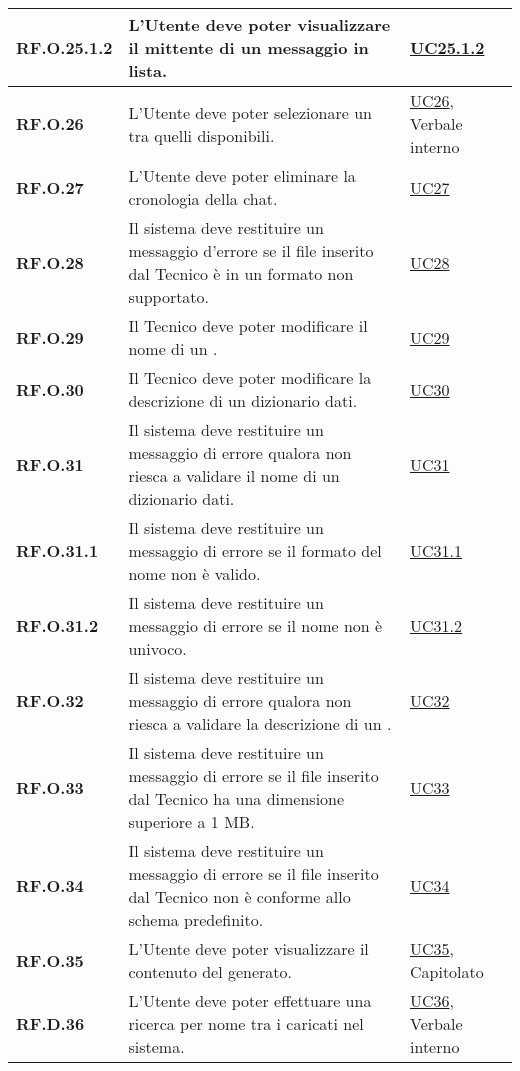 \begin{adjustwidth}{-0.5cm}{-0.5cm}
\begin{longtable}{|P{3cm}|P{6,5cm}|>{\arraybackslash}P{4cm}|}
    \hline
    \textbf{RF.O.25.1.2} & L'Utente deve poter visualizzare il mittente di un messaggio in lista. &  \hyperref[UC25point1point2]{UC25.1.2}\\
    \hline
    \textbf{RF.O.26} & L'Utente deve poter selezionare un  tra quelli disponibili. & \hyperref[UC26]{UC26}, Verbale interno \\
    \hline
    \textbf{RF.O.27} & L'Utente deve poter eliminare la cronologia della chat. & \hyperref[UC27]{UC27} \\
    \hline
    \textbf{RF.O.28} & Il sistema deve restituire un messaggio d'errore se il file inserito dal Tecnico è in un formato non supportato. & \hyperref[UC28]{UC28} \\
    \hline
    \textbf{RF.O.29} & Il Tecnico deve poter modificare il nome di un . & \hyperref[UC29]{UC29} \\
    \hline
    \textbf{RF.O.30} & Il Tecnico deve poter modificare la descrizione di un dizionario dati. & \hyperref[UC30]{UC30} \\
    \hline
    \textbf{RF.O.31} & Il sistema deve restituire un messaggio di errore qualora non riesca a validare il nome di un dizionario dati. & \hyperref[UC31]{UC31} \\
    \hline
    \textbf{RF.O.31.1} & Il sistema deve restituire un messaggio di errore se il formato del nome non è valido. & \hyperref[UC31point1]{UC31.1} \\
    \hline
    \textbf{RF.O.31.2} & Il sistema deve restituire un messaggio di errore se il nome non è univoco. & \hyperref[UC31point2]{UC31.2} \\
    \hline
    \textbf{RF.O.32} & Il sistema deve restituire un messaggio di errore qualora non riesca a validare la descrizione di un . & \hyperref[UC32]{UC32} \\
    \hline
    \textbf{RF.O.33} & Il sistema deve restituire un messaggio di errore se il file inserito dal Tecnico ha una dimensione superiore a 1 MB. & \hyperref[UC33]{UC33} \\
    \hline
    \textbf{RF.O.34} & Il sistema deve restituire un messaggio di errore se il file inserito dal Tecnico non è conforme allo schema predefinito. & \hyperref[UC34]{UC34} \\
    \hline
    \textbf{RF.O.35} & L'Utente deve poter visualizzare il contenuto del  generato. & \hyperref[UC35]{UC35}, Capitolato \\
    \hline
    \textbf{RF.D.36} & L'Utente deve poter effettuare una ricerca per nome tra i  caricati nel sistema. & \hyperref[UC36]{UC36}, Verbale interno \\

\end{longtable}
\end{adjustwidth}
